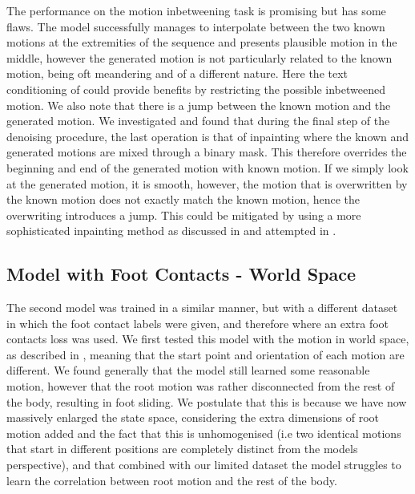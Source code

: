 The performance on the motion inbetweening task is promising but has some flaws. The model successfully manages to interpolate between the two known motions at the extremities of the sequence and presents plausible motion in the middle, however the generated motion is not particularly related to the known motion, being oft meandering and of a different nature. Here the text conditioning of \cite{MDM} could provide benefits by restricting the possible inbetweened motion. We also note that there is a jump between the known motion and the generated motion. We investigated and found that during the final step of the denoising procedure, the last operation is that of inpainting where the known and generated motions are mixed through a binary mask. This therefore overrides the beginning and end of the generated motion with known motion. If we simply look at the generated motion, it is smooth, however, the motion that is overwritten by the known motion does not exactly match the known motion, hence the overwriting introduces a jump. This could be mitigated by using a more sophisticated inpainting method as discussed in  and attempted in .


\subsection{Model with Foot Contacts - World Space}
\label{sec:diffusion_contacts_world_space}

The second model was trained in a similar manner, but with a different dataset in which the foot contact labels were given, and therefore where an extra foot contacts loss was used. We first tested this model with the motion in world space, as described in , meaning that the start point and orientation of each motion are different. We found generally that the model still learned some reasonable motion, however that the root motion was rather disconnected from the rest of the body, resulting in foot sliding. We postulate that this is because we have now massively enlarged the state space, considering the extra dimensions of root motion added and the fact that this is unhomogenised (i.e two identical motions that start in different positions are completely distinct from the models perspective), and that combined with our limited dataset the model struggles to learn the correlation between root motion and the rest of the body.

